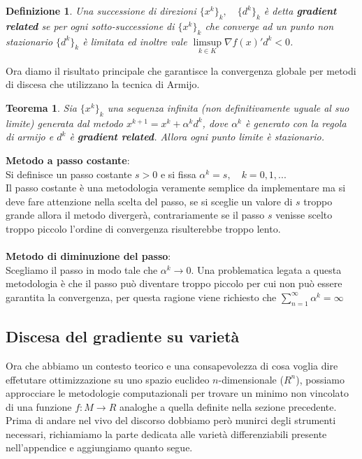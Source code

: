 \documentclass[a4paper, 12pt]{article}
\newtheorem{theorem}{Teorema}
\newtheorem{definition}{Definizione}
\begin{document}
\begin{definition}
Una successione di direzioni $\{x^k\}_k, \quad \{d^k\}_k$ è detta \textbf{gradient related} se per ogni sotto-successione di $\{x^k\}_k$ che converge ad un punto non stazionario $\{d^k\}_k$ è limitata ed inoltre vale $\limsup\limits_{k \in K} \nabla f(x)'d^k < 0$.
\end{definition}
Ora diamo il risultato principale che garantisce la convergenza globale per metodi di discesa che utilizzano la tecnica di Armijo.
\begin{theorem}
Sia $\{x^k\}_k$ una sequenza infinita (non definitivamente uguale al suo limite) generata dal metodo $x^{k+1} = x^k + \alpha^k d^k$, dove $\alpha^k$ è generato con la regola di armijo e $d^k$ è \textbf{gradient related}. Allora ogni punto limite è stazionario.
\end{theorem}
\textbf{Metodo a passo costante}:\\
Si definisce un passo costante $s > 0$ e si fissa $\alpha^k = s, \quad k = 0,1, ...$\\
Il passo costante è una metodologia veramente semplice da implementare ma si deve fare attenzione nella scelta del passo, se si sceglie un valore di $s$ troppo grande allora il metodo divergerà, contrariamente se il passo $s$ venisse scelto troppo piccolo l'ordine di convergenza risulterebbe troppo lento.\\\\
\textbf{Metodo di diminuzione del passo}:\\
Scegliamo il passo in modo tale che $\alpha^k \rightarrow 0$. Una problematica legata a questa metodologia è che il passo può diventare troppo piccolo per cui non può essere garantita la convergenza, per questa ragione viene richiesto che $\sum_{n=1}^{\infty} \alpha^k = \infty$

\subsection{Discesa del gradiente su varietà}
Ora che abbiamo un contesto teorico e una consapevolezza di cosa voglia dire effetutare ottimizzazione su uno spazio euclideo $n$-dimensionale ($R^n$), possiamo approcciare le metodologie computazionali per trovare un minimo non vincolato di una funzione $f:M \to R$ analoghe a quella definite nella sezione precedente. Prima di andare nel vivo del discorso dobbiamo però munirci degli strumenti necessari, richiamiamo la parte dedicata alle varietà differenziabili presente nell'appendice e aggiungiamo quanto segue.
\end{document}
